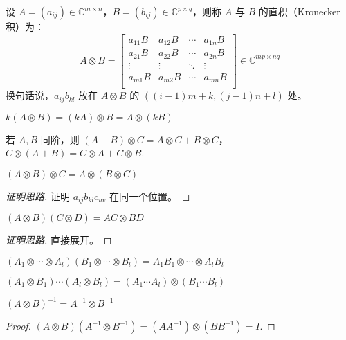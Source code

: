 \begin{definition}[直积 / Kronecker 积]
设 $A=(a_{ij})\in\mathbb C^{m\times n}$，$B=(b_{ij})\in\mathbb C^{p\times q}$，则称 $A$ 与 $B$ 的直积（Kronecker 积）为：
\[
    A\otimes B=
    \begin{bmatrix}
    a_{11}B&a_{12}B&\cdots&a_{1n}B\\
    a_{21}B&a_{22}B&\cdots&a_{2n}B\\
    \vdots&\vdots&\ddots&\vdots\\
    a_{m1}B&a_{m2}B&\cdots&a_{mn}B\\
    \end{bmatrix}\in\mathbb C^{mp\times nq}
\]
换句话说，$a_{ij}b_{kl}$ 放在 $A\otimes B$ 的 $((i-1)m+k,(j-1)n+l)$ 处。
\end{definition}

\begin{property}
$k(A\otimes B)=(kA)\otimes B=A\otimes(kB)$
\end{property}

\begin{property}
若 $A,B$ 同阶，则 $(A+B)\otimes C=A\otimes C+B\otimes C$，$C\otimes(A+B)=C\otimes A+C\otimes B$.
\end{property}

\begin{property}
$(A\otimes B)\otimes C=A\otimes(B\otimes C)$
\end{property}
\begin{proof}[证明思路]
证明 $a_{ij}b_{kl}c_{uv}$ 在同一个位置。
\end{proof}

\begin{property}
$(A\otimes B)(C\otimes D)=AC\otimes BD$
\end{property}
\begin{proof}[证明思路]
直接展开。
\end{proof}

\begin{corollary}
$(A_1\otimes\cdots\otimes A_l)(B_1\otimes\cdots\otimes B_l)=A_1B_1\otimes\cdots\otimes A_lB_l$
\end{corollary}

\begin{corollary}
$(A_1\otimes B_1)\cdots(A_l\otimes B_l)=(A_1\cdots A_l)\otimes(B_1\cdots B_l)$
\end{corollary}

\begin{property}
$(A\otimes B)^{-1}=A^{-1}\otimes B^{-1}$
\end{property}
\begin{proof}
$(A\otimes B)(A^{-1}\otimes B^{-1})=(AA^{-1})\otimes(BB^{-1})=I$.
\end{proof}

